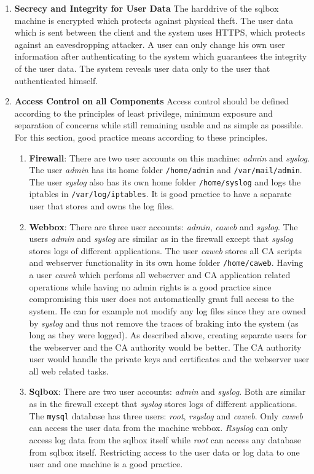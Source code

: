 \documentclass[english]{article}
\newcommand{\code}[1]{\texttt{#1}}
\begin{document}
\begin{enumerate}
\item \textbf{Secrecy and Integrity for User Data}
  The harddrive of the sqlbox machine is encrypted which protects against physical theft. The user data which is sent between the client and the system uses HTTPS, which protects against an eavesdropping attacker. A user can only change his own user information after authenticating to the system which guarantees the integrity of the user data. The system reveals user data only to the user that authenticated himself.
\item \textbf{Access Control on all Components}
Access control should be defined according to the principles of least privilege, minimum exposure and separation of concerns while still remaining usable and as simple as possible. For this section, good practice means according to these principles.
\begin{enumerate}[label=(\alph*)]
\item \textbf{Firewall}: There are two user accounts on this machine: \textit{admin} and \textit{syslog}. The user \textit{admin} has its home folder \texttt{/home/admin} and \texttt{/var/mail/admin}. The user \textit{syslog} also has its own home folder \texttt{/home/syslog} and logs the iptables in \texttt{/var/log/iptables}. It is good practice to have a separate user that stores and owns the log files.
\item \textbf{Webbox}: There are three user accounts: \textit{admin}, \textit{caweb} and \textit{syslog}. The users \textit{admin} and \textit{syslog} are similar as in the firewall except that \textit{syslog} stores logs of different applications. The user \textit{caweb} stores all CA scripts and webserver functionality in its own home folder \texttt{/home/caweb}. Having a user \textit{caweb} which perfoms all webserver and CA application related operations while having no admin rights is a good practice since compromising this user does not automatically grant full access to the system. He can for example not modify any log files since they are owned by \textit{syslog} and thus not remove the traces of braking into the system (as long as they were logged). As described above, creating separate users for the webserver and the CA authority would be better. The CA authority user would handle the private keys and certificates and the webserver user all web related tasks.
\item \textbf{Sqlbox}: There are two user accounts: \textit{admin} and \textit{syslog}. Both are similar as in the firewall except that \textit{syslog} stores logs of different applications. The \code{mysql} database has three users: \textit{root}, \textit{rsyslog} and \textit{caweb}. Only \textit{caweb} can access the user data from the machine webbox. \textit{Rsyslog} can only access log data from the sqlbox itself while \textit{root} can access any database from sqlbox itself. Restricting access to the user data or log data to one user and one machine is a good practice.

\end{enumerate}
\end{enumerate}
\end{document}
